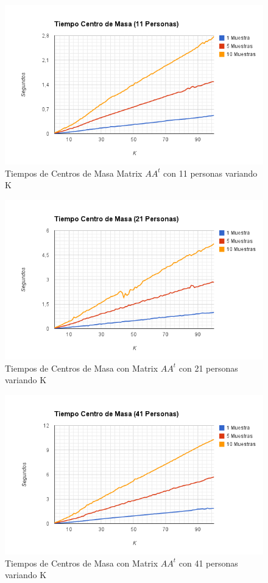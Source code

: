 \begin{figure}[H]
\includegraphics[width=1\textwidth]{img/imagef7.png}
     \caption{Tiempos de Centros de Masa Matrix $AA^t$ con 11 personas variando K}
\end{figure}

\begin{figure}[H]
\includegraphics[width=1\textwidth]{img/imagef8.png}
     \caption{Tiempos de Centros de Masa con Matrix $AA^t$ con 21 personas variando K}
\end{figure}

\begin{figure}[H]
\includegraphics[width=1\textwidth]{img/imagef9.png}
     \caption{Tiempos de Centros de Masa con Matrix $AA^t$ con 41 personas variando K}
\end{figure}

